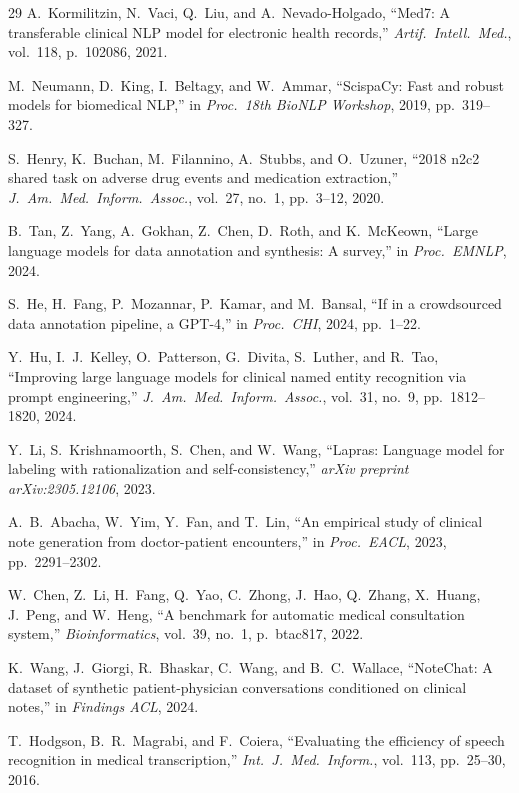 \documentclass[conference]{IEEEtran}
\begin{document}
\begin{thebibliography}{29}
A.~Kormilitzin, N.~Vaci, Q.~Liu, and A.~Nevado-Holgado,
``Med7: A transferable clinical NLP model for electronic health records,''
\emph{Artif.\ Intell.\ Med.}, vol.~118, p.~102086, 2021.

M.~Neumann, D.~King, I.~Beltagy, and W.~Ammar,
``ScispaCy: Fast and robust models for biomedical NLP,''
in \emph{Proc.\ 18th BioNLP Workshop}, 2019, pp.~319--327.

S.~Henry, K.~Buchan, M.~Filannino, A.~Stubbs, and O.~Uzuner,
``2018 n2c2 shared task on adverse drug events and medication extraction,''
\emph{J.\ Am.\ Med.\ Inform.\ Assoc.}, vol.~27, no.~1, pp.~3--12, 2020.

B.~Tan, Z.~Yang, A.~Gokhan, Z.~Chen, D.~Roth, and K.~McKeown,
``Large language models for data annotation and synthesis: A survey,''
in \emph{Proc.\ EMNLP}, 2024.

S.~He, H.~Fang, P.~Mozannar, P.~Kamar, and M.~Bansal,
``If in a crowdsourced data annotation pipeline, a GPT-4,''
in \emph{Proc.\ CHI}, 2024, pp.~1--22.

Y.~Hu, I.~J.~Kelley, O.~Patterson, G.~Divita, S.~Luther, and R.~Tao,
``Improving large language models for clinical named entity recognition via
prompt engineering,''
\emph{J.\ Am.\ Med.\ Inform.\ Assoc.}, vol.~31, no.~9, pp.~1812--1820, 2024.

Y.~Li, S.~Krishnamoorth, S.~Chen, and W.~Wang,
``Lapras: Language model for labeling with rationalization and
self-consistency,''
\emph{arXiv preprint arXiv:2305.12106}, 2023.

A.~B.~Abacha, W.~Yim, Y.~Fan, and T.~Lin,
``An empirical study of clinical note generation from doctor-patient
encounters,''
in \emph{Proc.\ EACL}, 2023, pp.~2291--2302.

W.~Chen, Z.~Li, H.~Fang, Q.~Yao, C.~Zhong, J.~Hao, Q.~Zhang, X.~Huang,
J.~Peng, and W.~Heng,
``A benchmark for automatic medical consultation system,''
\emph{Bioinformatics}, vol.~39, no.~1, p.~btac817, 2022.

K.~Wang, J.~Giorgi, R.~Bhaskar, C.~Wang, and B.~C.~Wallace,
``NoteChat: A dataset of synthetic patient-physician conversations conditioned
on clinical notes,''
in \emph{Findings ACL}, 2024.

T.~Hodgson, B.~R.~Magrabi, and F.~Coiera,
``Evaluating the efficiency of speech recognition in medical transcription,''
\emph{Int.\ J.\ Med.\ Inform.}, vol.~113, pp.~25--30, 2016.


\end{thebibliography}
\end{document}
